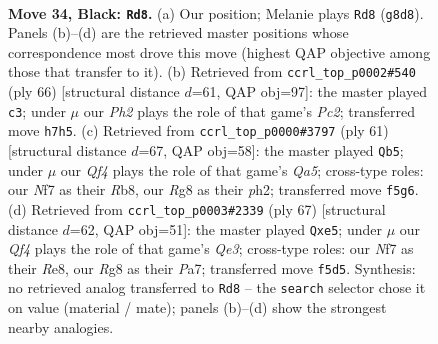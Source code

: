 \documentclass[11pt]{article}
\begin{document}
\clearpage

\begin{figure}[p]\centering
\begin{subfigure}{0.46\textwidth}\centering
\resizebox{\linewidth}{!}{%
\newchessgame
\chessboard[
  setfen={2k3r1/p1p2npp/1p2p3/2p2qP1/5P2/2P4P/1P1Q4/2KR4 b - - 2 34},
  showmover=false,
  pgfstyle=straightmove, color=movearrow, markmove={g8-d8}
]}
\caption{}
\end{subfigure}\hfill
\begin{subfigure}{0.46\textwidth}\centering
\resizebox{\linewidth}{!}{%
\newchessgame
\chessboard[
  setfen={4r3/p4q1k/2p4p/2Qpnp2/4pN2/1P4P1/P1P2P1P/5R1K w - - 2 34},
  showmover=false,
  pgfstyle=straightmove, color=movearrow, markmove={c2-c3}
]}
\caption{}
\end{subfigure}
\\[4pt]
\begin{subfigure}{0.46\textwidth}\centering
\resizebox{\linewidth}{!}{%
\newchessgame
\chessboard[
  setfen={1r6/3kp2p/p2p4/2p1pP2/q3P3/P7/1PP1Q2P/2K1R3 b - - 0 31},
  showmover=false,
  pgfstyle=straightmove, color=movearrow, markmove={a4-b5}
]}
\caption{}
\end{subfigure}\hfill
\begin{subfigure}{0.46\textwidth}\centering
\resizebox{\linewidth}{!}{%
\newchessgame
\chessboard[
  setfen={4r1k1/p4p2/1p2q1p1/4P2p/3R1Q2/1P4PP/P4PK1/8 b - - 0 34},
  showmover=false,
  pgfstyle=straightmove, color=movearrow, markmove={e6-e5}
]}
\caption{}
\end{subfigure}
\caption{\textbf{Move 34, Black: \texttt{Rd8}.} (a) Our position; Melanie plays \texttt{Rd8} (\texttt{g8d8}). Panels (b)--(d) are the retrieved master positions whose correspondence most drove this move (highest QAP objective among those that transfer to it). (b) Retrieved from \texttt{ccrl\_top\_p0002\#540} (ply 66) [structural distance $d$=61, QAP obj=97]: the master played \texttt{c3}; under $\mu$ our \emph{Ph2} plays the role of that game's \emph{Pc2}; transferred move \texttt{h7h5}. (c) Retrieved from \texttt{ccrl\_top\_p0000\#3797} (ply 61) [structural distance $d$=67, QAP obj=58]: the master played \texttt{Qb5}; under $\mu$ our \emph{Qf4} plays the role of that game's \emph{Qa5}; cross-type roles: our \emph{N}f7 as their \emph{R}b8, our \emph{R}g8 as their \emph{p}h2; transferred move \texttt{f5g6}. (d) Retrieved from \texttt{ccrl\_top\_p0003\#2339} (ply 67) [structural distance $d$=62, QAP obj=51]: the master played \texttt{Qxe5}; under $\mu$ our \emph{Qf4} plays the role of that game's \emph{Qe3}; cross-type roles: our \emph{N}f7 as their \emph{R}e8, our \emph{R}g8 as their \emph{P}a7; transferred move \texttt{f5d5}. Synthesis: no retrieved analog transferred to \texttt{Rd8} -- the \texttt{search} selector chose it on value (material / mate); panels (b)--(d) show the strongest nearby analogies.}
\label{fig:thought-m67}
\end{figure}
\end{document}
